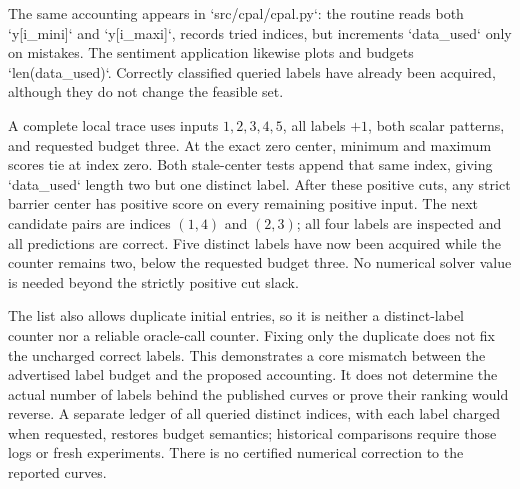 \documentclass[10pt]{article}
\begin{document}
The same accounting appears in `src/cpal/cpal.py`: the routine reads both `y[i\_mini]` and `y[i\_maxi]`, records tried indices, but increments `data\_used` only on mistakes. The sentiment application likewise plots and budgets `len(data\_used)`. Correctly classified queried labels have already been acquired, although they do not change the feasible set.\par
A complete local trace uses inputs \(1,2,3,4,5\), all labels \(+1\), both scalar patterns, and requested budget three. At the exact zero center, minimum and maximum scores tie at index zero. Both stale-center tests append that same index, giving `data\_used` length two but one distinct label. After these positive cuts, any strict barrier center has positive score on every remaining positive input. The next candidate pairs are indices \((1,4)\) and \((2,3)\); all four labels are inspected and all predictions are correct. Five distinct labels have now been acquired while the counter remains two, below the requested budget three. No numerical solver value is needed beyond the strictly positive cut slack.\par
The list also allows duplicate initial entries, so it is neither a distinct-label counter nor a reliable oracle-call counter. Fixing only the duplicate does not fix the uncharged correct labels. This demonstrates a core mismatch between the advertised label budget and the proposed accounting. It does not determine the actual number of labels behind the published curves or prove their ranking would reverse. A separate ledger of all queried distinct indices, with each label charged when requested, restores budget semantics; historical comparisons require those logs or fresh experiments. There is no certified numerical correction to the reported curves.\par
\end{document}
